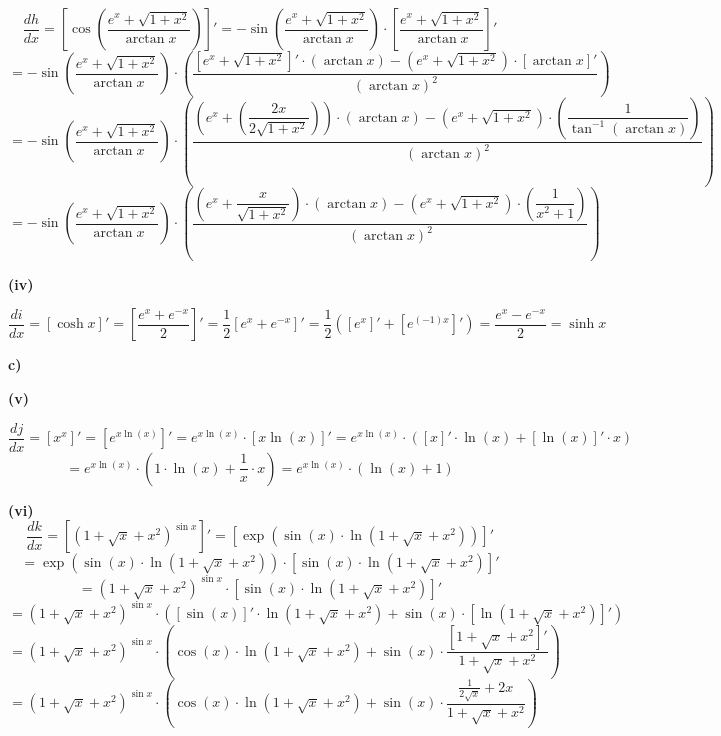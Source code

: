 \documentclass[a4paper,graphics,11pt]{article}
\begin{document}
$$
    \frac{dh}{dx} = \left[\cos\left(\frac{e^x+\sqrt{1+x^2}}{\arctan x}\right)\right]'
    = -\sin\left(\frac{e^x+\sqrt{1+x^2}}{\arctan x}\right) \cdot
        \left[\frac{e^x+\sqrt{1+x^2}}{\arctan x}\right]'
$$$$
    = -\sin\left(\frac{e^x+\sqrt{1+x^2}}{\arctan x}\right) \cdot
        \left(\frac{\left[e^x+\sqrt{1+x^2}\right]'\cdot (\arctan x) -
        (e^x+\sqrt{1+x^2}) \cdot [\arctan x]'}{(\arctan x)^2} \right)
$$$$
    = -\sin\left(\frac{e^x+\sqrt{1+x^2}}{\arctan x}\right) \cdot
        \left(\frac{\left(e^x+\left(\dfrac{2x}{2\sqrt{1+x^2}}\right)\right)\cdot (\arctan x) -
        (e^x+\sqrt{1+x^2}) \cdot \left(\dfrac{1}{\tan^{-1}(\arctan x)}\right)}{(\arctan x)^2} \right)
$$$$
    = -\sin\left(\frac{e^x+\sqrt{1+x^2}}{\arctan x}\right) \cdot
        \left(\frac{\left(e^x+\dfrac{x}{\sqrt{1+x^2}}\right)\cdot (\arctan x) -
        (e^x+\sqrt{1+x^2}) \cdot \left(\dfrac{1}{x^2+1}\right)}{(\arctan x)^2}
        \right)
$$

\textbf{(iv)}

$$
    \frac{di}{dx} = [\cosh x]'
    = \left[\frac{e^x+e^{-x}}{2}\right]'
    = \frac{1}{2} \left[e^x+e^{-x}\right]'
    = \frac{1}{2} \left([e^x]' + [e^{(-1)x}]'\right)
    = \frac{e^x-e^{-x}}{2}
    = \sinh x
$$


\textbf{c)}

\textbf{(v)}

$$
    \frac{dj}{dx} = [x^x]' = \left[e^{x\ln(x)}\right]'
    = e^{x\ln(x)} \cdot [x\ln(x)]'
    = e^{x\ln(x)} \cdot ([x]' \cdot \ln(x) + [\ln(x)]' \cdot x)
$$$$
    = e^{x\ln(x)} \cdot (1 \cdot \ln(x) + \frac{1}{x} \cdot x)
    = e^{x\ln(x)} \cdot (\ln(x) + 1)
$$

\textbf{(vi)}
$$
    \frac{dk}{dx} = \left[\left(1 + \sqrt{x} + x^2\right)^{\sin x}\right]'
    = \left[\exp\left(\sin(x)\cdot \ln\left(1 + \sqrt{x} + x^2\right)\right) \right]'
$$$$
    = \exp\left(\sin(x)\cdot \ln\left(1 + \sqrt{x} + x^2\right)\right)
        \cdot \left[\sin(x)\cdot \ln\left(1 + \sqrt{x} + x^2\right)\right]'
$$$$
    = \left(1+\sqrt{x} + x^2\right)^{\sin x}
        \cdot \left[\sin(x)\cdot \ln\left(1 + \sqrt{x} + x^2\right)\right]'
$$$$
    = \left(1+\sqrt{x} + x^2\right)^{\sin x}
        \cdot \left([\sin(x)]'\cdot \ln\left(1 + \sqrt{x} + x^2\right)
        + \sin(x) \cdot \left[\ln\left(1+\sqrt{x} + x^2\right)\right]'\right)
$$$$
    = \left(1+\sqrt{x} + x^2\right)^{\sin x}
        \cdot \left(\cos(x)\cdot \ln\left(1 + \sqrt{x} + x^2\right)
        + \sin(x) \cdot \frac{[1+\sqrt{x}+x^2]'}{1+\sqrt{x} + x^2}\right)
$$$$
    = \left(1+\sqrt{x} + x^2\right)^{\sin x}
        \cdot \left(\cos(x)\cdot \ln\left(1 + \sqrt{x} + x^2\right)
        + \sin(x) \cdot \frac{\frac{1}{2\sqrt{x}}+2x}{1+\sqrt{x} + x^2}\right)
$$
\newpage
\end{document}

